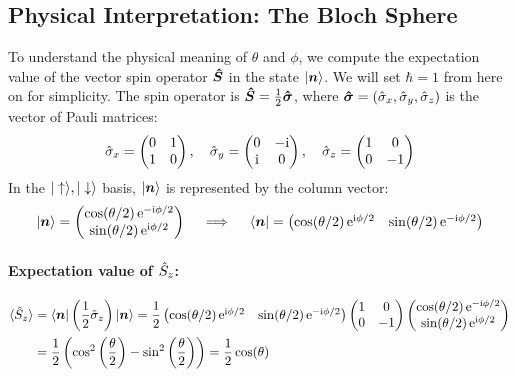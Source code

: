 \subsection{Physical Interpretation: The Bloch Sphere}

To understand the physical meaning of $\theta$ and $\phi$, we compute the expectation value of the vector spin operator $\bm{\hat{S}}$ in the state $|\bm{n}\rangle$. We will set $\hbar = 1$ from here on for simplicity. The spin operator is $\bm{\hat{S}} = \frac{1}{2}\bm{\hat{\sigma}}$, where $\bm{\hat{\sigma}} = (\hat{\sigma}_x, \hat{\sigma}_y, \hat{\sigma}_z)$ is the vector of Pauli matrices:
\begin{equation}
    \hat{\sigma}_x = \begin{pmatrix} 0 & 1 \\ 1 & 0 \end{pmatrix}, \quad
    \hat{\sigma}_y = \begin{pmatrix} 0 & -\mathrm{i} \\ \mathrm{i} & 0 \end{pmatrix}, \quad
    \hat{\sigma}_z = \begin{pmatrix} 1 & 0 \\ 0 & -1 \end{pmatrix}
\end{equation}
In the $|\uparrow\rangle, |\downarrow\rangle$ basis, $|\bm{n}\rangle$ is represented by the column vector:
\begin{equation}
    |\bm{n}\rangle = \begin{pmatrix} \cos(\theta/2) \, \mathrm{e}^{-\mathrm{i}\phi/2} \\ \sin(\theta/2) \, \mathrm{e}^{\mathrm{i}\phi/2} \end{pmatrix}
    \quad \implies \quad
    \langle\bm{n}| = \begin{pmatrix} \cos(\theta/2) \, \mathrm{e}^{\mathrm{i}\phi/2} & \sin(\theta/2) \, \mathrm{e}^{-\mathrm{i}\phi/2} \end{pmatrix}
\end{equation}

\paragraph{Expectation value of $\hat{S}_z$:}
\begin{equation}\begin{aligned}
    \langle \hat{S}_z \rangle &= \langle\bm{n}| \left(\frac{1}{2}\hat{\sigma}_z\right) |\bm{n}\rangle
    = \frac{1}{2} \begin{pmatrix} \cos(\theta/2) \, \mathrm{e}^{\mathrm{i}\phi/2} & \sin(\theta/2) \, \mathrm{e}^{-\mathrm{i}\phi/2} \end{pmatrix}
      \begin{pmatrix} 1 & 0 \\ 0 & -1 \end{pmatrix}
      \begin{pmatrix} \cos(\theta/2) \, \mathrm{e}^{-\mathrm{i}\phi/2} \\ \sin(\theta/2) \, \mathrm{e}^{\mathrm{i}\phi/2} \end{pmatrix} \\
    &= \frac{1}{2} \left( \cos^2\left(\frac{\theta}{2}\right) - \sin^2\left(\frac{\theta}{2}\right) \right)
    = \frac{1}{2} \cos(\theta)
\end{aligned}\end{equation}

